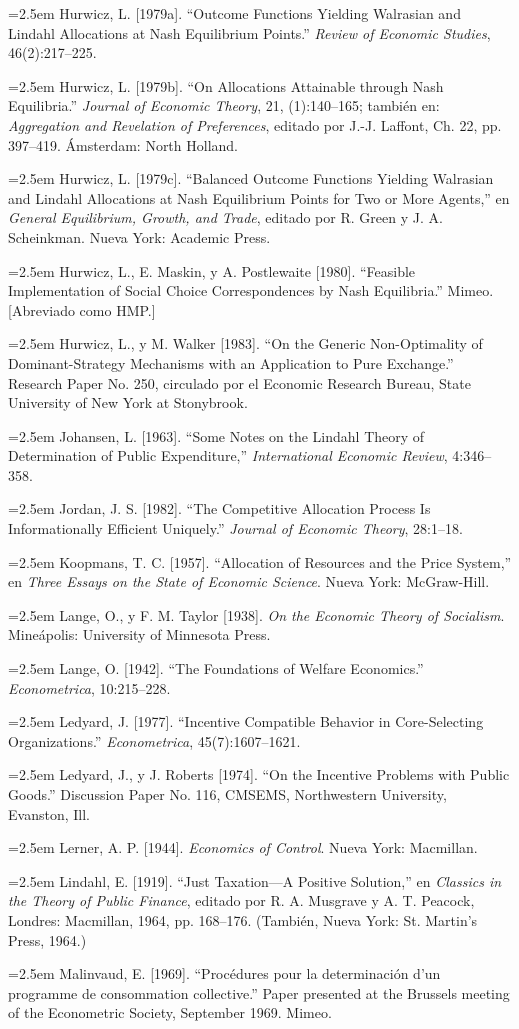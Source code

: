 \documentclass[12pt, letterpaper]{article}
\newcommand{\bibentry}[1]{\noindent\hangindent=2.5em\hangafter=1 \small #1 \par\vspace{0.75em}}
\begin{document}
\bibentry{Hurwicz, L. [1979a]. ``Outcome Functions Yielding Walrasian and Lindahl Allocations at Nash Equilibrium Points.'' \textit{Review of Economic Studies}, 46(2):217--225.}
\bibentry{Hurwicz, L. [1979b]. ``On Allocations Attainable through Nash Equilibria.'' \textit{Journal of Economic Theory}, 21, (1):140--165; también en: \textit{Aggregation and Revelation of Preferences}, editado por J.-J. Laffont, Ch. 22, pp. 397--419. Ámsterdam: North Holland.}
\bibentry{Hurwicz, L. [1979c]. ``Balanced Outcome Functions Yielding Walrasian and Lindahl Allocations at Nash Equilibrium Points for Two or More Agents,'' en \textit{General Equilibrium, Growth, and Trade}, editado por R. Green y J. A. Scheinkman. Nueva York: Academic Press.}
\bibentry{Hurwicz, L., E. Maskin, y A. Postlewaite [1980]. ``Feasible Implementation of Social Choice Correspondences by Nash Equilibria.'' Mimeo. [Abreviado como HMP.]}
\bibentry{Hurwicz, L., y M. Walker [1983]. ``On the Generic Non-Optimality of Dominant-Strategy Mechanisms with an Application to Pure Exchange.'' Research Paper No. 250, circulado por el Economic Research Bureau, State University of New York at Stonybrook.}
\bibentry{Johansen, L. [1963]. ``Some Notes on the Lindahl Theory of Determination of Public Expenditure,'' \textit{International Economic Review}, 4:346--358.}
\bibentry{Jordan, J. S. [1982]. ``The Competitive Allocation Process Is Informationally Efficient Uniquely.'' \textit{Journal of Economic Theory}, 28:1--18.}
\bibentry{Koopmans, T. C. [1957]. ``Allocation of Resources and the Price System,'' en \textit{Three Essays on the State of Economic Science}. Nueva York: McGraw-Hill.}
\bibentry{Lange, O., y F. M. Taylor [1938]. \textit{On the Economic Theory of Socialism}. Mineápolis: University of Minnesota Press.}
\bibentry{Lange, O. [1942]. ``The Foundations of Welfare Economics.'' \textit{Econometrica}, 10:215--228.}
\bibentry{Ledyard, J. [1977]. ``Incentive Compatible Behavior in Core-Selecting Organizations.'' \textit{Econometrica}, 45(7):1607--1621.}
\bibentry{Ledyard, J., y J. Roberts [1974]. ``On the Incentive Problems with Public Goods.'' Discussion Paper No. 116, CMSEMS, Northwestern University, Evanston, Ill.}
\bibentry{Lerner, A. P. [1944]. \textit{Economics of Control}. Nueva York: Macmillan.}
\bibentry{Lindahl, E. [1919]. ``Just Taxation---A Positive Solution,'' en \textit{Classics in the Theory of Public Finance}, editado por R. A. Musgrave y A. T. Peacock, Londres: Macmillan, 1964, pp. 168--176. (También, Nueva York: St. Martin's Press, 1964.)}
\bibentry{Malinvaud, E. [1969]. ``Procédures pour la determinación d'un programme de consommation collective.'' Paper presented at the Brussels meeting of the Econometric Society, September 1969. Mimeo.}
\end{document}
